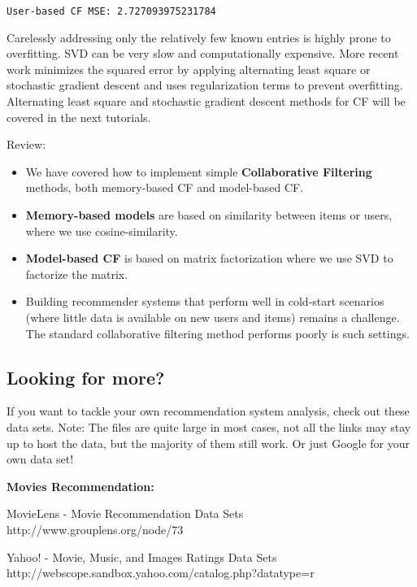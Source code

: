 \documentclass[11pt]{article}
\providecommand{\tightlist}{%
      \setlength{\itemsep}{0pt}\setlength{\parskip}{0pt}}
\begin{document}
    \begin{Verbatim}[commandchars=\\\{\}]
User-based CF MSE: 2.727093975231784

    \end{Verbatim}

    Carelessly addressing only the relatively few known entries is highly
prone to overfitting. SVD can be very slow and computationally
expensive. More recent work minimizes the squared error by applying
alternating least square or stochastic gradient descent and uses
regularization terms to prevent overfitting. Alternating least square
and stochastic gradient descent methods for CF will be covered in the
next tutorials.

    Review:

\begin{itemize}
\tightlist
\item
  We have covered how to implement simple \textbf{Collaborative
  Filtering} methods, both memory-based CF and model-based CF.
\item
  \textbf{Memory-based models} are based on similarity between items or
  users, where we use cosine-similarity.
\item
  \textbf{Model-based CF} is based on matrix factorization where we use
  SVD to factorize the matrix.
\item
  Building recommender systems that perform well in cold-start scenarios
  (where little data is available on new users and items) remains a
  challenge. The standard collaborative filtering method performs poorly
  is such settings.
\end{itemize}

    \hypertarget{looking-for-more}{%
\subsection{Looking for more?}\label{looking-for-more}}

If you want to tackle your own recommendation system analysis, check out
these data sets. Note: The files are quite large in most cases, not all
the links may stay up to host the data, but the majority of them still
work. Or just Google for your own data set!

\textbf{Movies Recommendation:}

MovieLens - Movie Recommendation Data Sets
http://www.grouplens.org/node/73

Yahoo! - Movie, Music, and Images Ratings Data Sets
http://webscope.sandbox.yahoo.com/catalog.php?datatype=r
\end{document}
